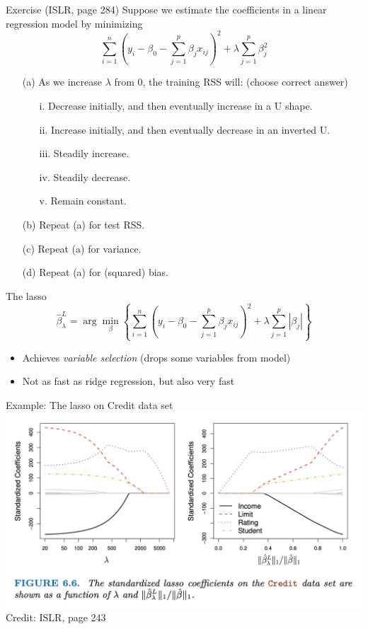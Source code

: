 \documentclass{beamer}
\begin{document}
  \begin{frame}{Exercise (ISLR, page 284)}
    \footnotesize
    Suppose we estimate the coefficients in a linear regression model by minimizing
    $$\sum_{i = 1}^n \left(y_i - \beta_0 - \sum_{j = 1}^p \beta_j x_{ij}\right)^2 + \lambda \sum_{j = 1}^p \beta_j^2$$
    \begin{itemize}
      \item[(a)] As we increase $\lambda$ from 0, the training RSS will: (choose correct answer)
      \begin{itemize}
        \item[i.] Decrease initially, and then eventually increase in a U shape.
        \item[ii.] Increase initially, and then eventually decrease in an inverted U.
        \item[iii.] Steadily increase.
        \item[iv.] Steadily decrease.
        \item[v.] Remain constant.
      \end{itemize}
      \item[(b)] Repeat (a) for test RSS.
      \item[(c)] Repeat (a) for variance.
      \item[(d)] Repeat (a) for (squared) bias.
    \end{itemize}
  \end{frame}

  \begin{frame}{The lasso}
    $$\hat\beta^L_\lambda = \arg\min_\beta \left\{ \sum_{i = 1}^n \left(y_i - \beta_0 - \sum_{j = 1}^p \beta_j x_{ij}\right)^2 + \lambda \sum_{j = 1}^p |\beta_j| \right\}$$
    \begin{itemize}
      \item Achieves {\it variable selection} (drops some variables from model)
      \item Not as fast as ridge regression, but also very fast
    \end{itemize}
  \end{frame}

  \begin{frame}{Example: The lasso on Credit data set}
    \includegraphics[width = \textwidth]{images/lasso_credit.png}
    \vfill
    \hfill \footnotesize Credit: ISLR, page 243
  \end{frame}
\end{document}
